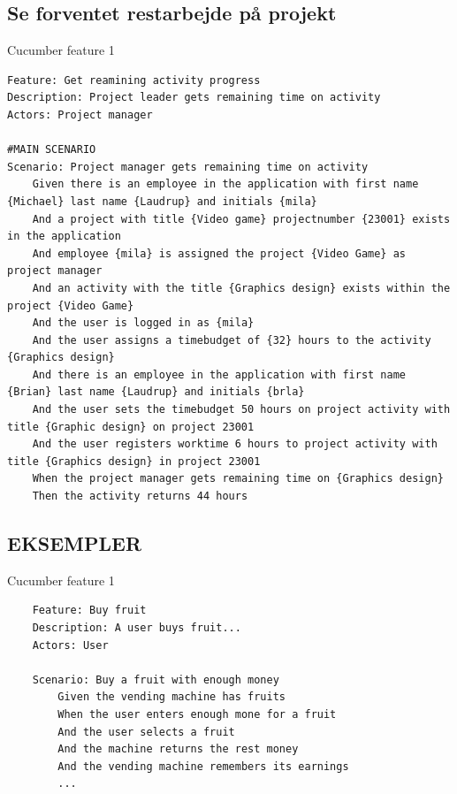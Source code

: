 \subsection{Se forventet restarbejde på projekt}
\begin{listing}[H]
    \centering
    \caption{Cucumber feature 1}\label{lst:feature1}
    \begin{verbatim}
Feature: Get reamining activity progress
Description: Project leader gets remaining time on activity
Actors: Project manager

#MAIN SCENARIO
Scenario: Project manager gets remaining time on activity
    Given there is an employee in the application with first name {Michael} last name {Laudrup} and initials {mila}
    And a project with title {Video game} projectnumber {23001} exists in the application
    And employee {mila} is assigned the project {Video Game} as project manager
    And an activity with the title {Graphics design} exists within the project {Video Game}
    And the user is logged in as {mila}
    And the user assigns a timebudget of {32} hours to the activity {Graphics design}
    And there is an employee in the application with first name {Brian} last name {Laudrup} and initials {brla}
    And the user sets the timebudget 50 hours on project activity with title {Graphic design} on project 23001
    And the user registers worktime 6 hours to project activity with title {Graphics design} in project 23001
    When the project manager gets remaining time on {Graphics design}
    Then the activity returns 44 hours
    \end{verbatim}
\end{listing}
\subsection{EKSEMPLER}

\begin{listing}[H]
    \centering
    \caption{Cucumber feature 1}\label{lst:feature1}
    \begin{verbatim}
    Feature: Buy fruit
    Description: A user buys fruit...
    Actors: User
        
    Scenario: Buy a fruit with enough money
        Given the vending machine has fruits
        When the user enters enough mone for a fruit
        And the user selects a fruit
        And the machine returns the rest money
        And the vending machine remembers its earnings
        ...
    \end{verbatim}
\end{listing}

